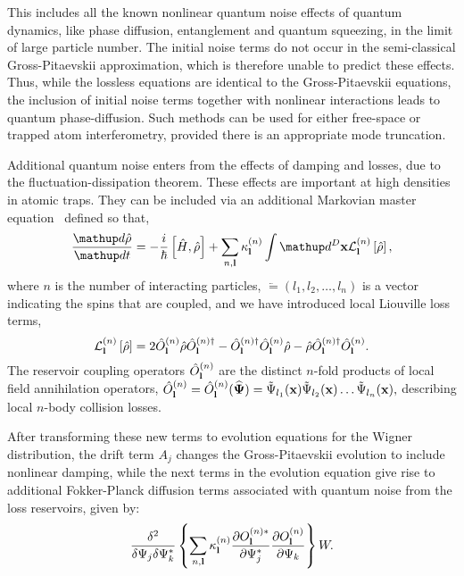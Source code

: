 This includes all the known nonlinear quantum noise effects of quantum dynamics,
like phase diffusion, entanglement and quantum squeezing, in the limit
of large particle number.
The initial noise terms do not occur in the semi-classical Gross-Pitaevskii
approximation, which is therefore unable to predict these effects.
Thus, while the lossless equations are identical to the Gross-Pitaevskii
equations, the inclusion of initial noise terms together with nonlinear
interactions leads to quantum phase-diffusion.
Such methods can be used for either free-space or trapped atom interferometry,
provided there is an appropriate mode truncation.

Additional quantum noise enters from the effects of damping and losses,
due to the fluctuation-dissipation theorem.
These effects are important at high densities in atomic traps.
They can be included via an additional Markovian master equation~\cite{Jack2002}
defined so that,
\begin{equation}
    \frac{\upd\hat{\rho}}{\upd t} =
        - \frac{i}{\hbar} \left[ \hat{H}, \hat{\rho} \right]
        + \sum_{n,\lvec} \kappa_{\lvec}^{(n)} \int \upd^{D}\xvec
            \mathcal{L}_{\lvec}^{(n)} \left[ \hat{\rho} \right],
\end{equation}
where $n$ is the number of interacting particles,
$\lvec = (l_1, l_2, \ldots, l_n)$ is a vector indicating the spins that are coupled,
and we have introduced local Liouville loss terms,
\begin{equation}
    \mathcal{L}_{\mathbf{l}}^{(n)} \left[ \hat{\rho} \right] =
        2\hat{O}_{\mathbf{l}}^{(n)} \hat{\rho} \hat{O}_{\mathbf{l}}^{(n)\dagger}
        - \hat{O}_{\mathbf{l}}^{(n)\dagger} \hat{O}_{\mathbf{l}}^{(n)} \hat{\rho}
        - \hat{\rho} \hat{O}_{\mathbf{l}}^{(n)\dagger} \hat{O}_{\mathbf{l}}^{(n)}.
\end{equation}
The reservoir coupling operators $\hat{O}_{\mathbf{l}}^{(n)}$ are the distinct $n$-fold products of local field annihilation operators,
$\hat{O}_{\mathbf{l}}^{(n)} = \hat{O}_{\mathbf{l}}^{(n)} (\widehat{\mathbf{\Psi}}) =
    \tilde{\Psi}_{l_{1}} (\mathbf{x})
    \tilde{\Psi}_{l_{2}} (\mathbf{x}) \ldots
    \tilde{\Psi}_{l_{n}} (\mathbf{x}),$
describing local $n$-body collision losses.

After transforming these new terms to evolution equations for the Wigner distribution, the drift term $A_j$
changes the Gross-Pitaevskii evolution to include nonlinear damping, while
the next terms in the evolution equation give rise to additional Fokker-Planck
diffusion terms associated with quantum noise from the loss reservoirs,
given by:
\begin{equation}
    \frac{\delta^{2}}{\delta\Psi_j\delta\Psi_k^{*}} \left\{
        \sum_{n,\mathbf{l}} \kappa_{\mathbf{l}}^{(n)}
            \frac{\partial O_{\mathbf{l}}^{(n)*}}{\partial\Psi_j^{*}}
            \frac{\partial O_{\mathbf{l}}^{(n)}}{\partial\Psi_k}
        \right\} W.
\end{equation}

